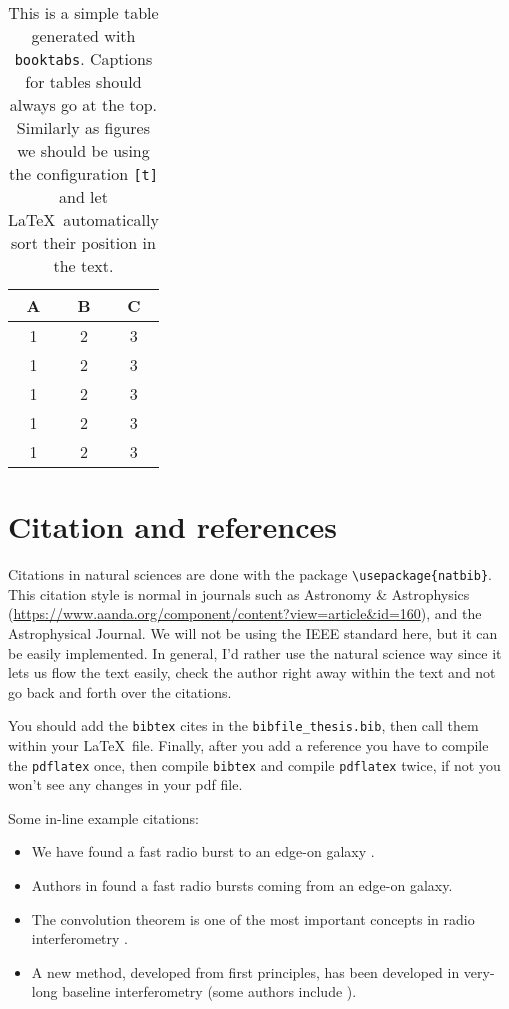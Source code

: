 \begin{table}[t]
  \centering
  \caption[My first table]{This is a simple table generated with \texttt{booktabs}. Captions for tables should always go at the top. Similarly as figures we should be using the configuration \texttt{[t]} and let \LaTeX\ automatically sort their position in the text.}
  \label{tab:my_table}
  \begin{tabular}{ccc}
    \toprule
    \textbf{A} & \textbf{B} & \textbf{C} \\ \midrule
    1 & 2 & 3 \\
    1 & 2 & 3 \\
    1 & 2 & 3 \\
    1 & 2 & 3 \\
    1 & 2 & 3 \\
    \bottomrule
  \end{tabular}
\end{table}

\section{Citation and references}
\label{sec:citations}

Citations in natural sciences are done with the package \verb|\usepackage{natbib}|. This citation style is normal in journals such as Astronomy \& Astrophysics (\url{https://www.aanda.org/component/content?view=article&id=160}), and the Astrophysical Journal. We will not be using the IEEE standard here, but it can be easily implemented. In general, I'd rather use the natural science way since it lets us flow the text easily, check the author right away within the text and not go back and forth over the citations.

You should add the \texttt{bibtex} cites in the \texttt{bibfile\_thesis.bib}, then call them within your \LaTeX\ file. Finally, after you add a reference you have to compile the \texttt{pdflatex} once, then compile \texttt{bibtex} and compile \texttt{pdflatex} twice, if not you won't see any changes in your pdf file.

Some in-line example citations:
\begin{itemize}
  \item We have found a fast radio burst to an edge-on galaxy \citep{2024NatAs...8.1429C}.
  \item Authors in \citet{2024NatAs...8.1429C} found a fast radio bursts coming from an edge-on galaxy.
  \item The convolution theorem is one of the most important concepts in radio interferometry \citep[see][chapter~3]{1965ftia.book.....B}.
  \item A new method, developed from first principles, has been developed in very-long baseline interferometry (some authors include \citealt{1965ftia.book.....B}).
\end{itemize}

